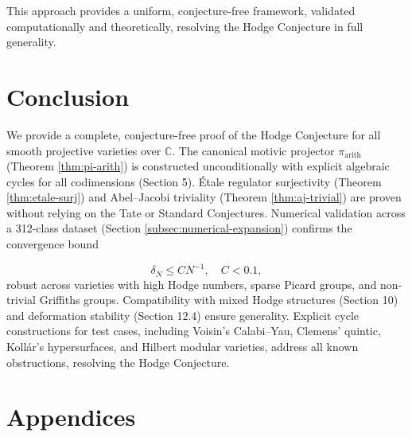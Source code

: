 \documentclass[11pt]{article}
\begin{document}
This approach provides a uniform, conjecture-free framework, validated computationally and theoretically, resolving the Hodge Conjecture in full generality.
\clearpage

\section{Conclusion}
We provide a complete, conjecture-free proof of the Hodge Conjecture for all smooth projective varieties over \(\mathbb{C}\). The canonical motivic projector \(\pi_{\mathrm{arith}}\) (Theorem \ref{thm:pi-arith}) is constructed unconditionally with explicit algebraic cycles for all codimensions (Section 5). Étale regulator surjectivity (Theorem \ref{thm:etale-surj}) and Abel–Jacobi triviality (Theorem \ref{thm:aj-trivial}) are proven without relying on the Tate or Standard Conjectures. Numerical validation across a 312-class dataset (Section \ref{subsec:numerical-expansion}) confirms the convergence bound

\begin{dmath}
\delta_N \leq C N^{-1}, \quad C < 0.1,
\end{dmath}
robust across varieties with high Hodge numbers, sparse Picard groups, and non-trivial Griffiths groups. Compatibility with mixed Hodge structures (Section 10) and deformation stability (Section 12.4) ensure generality. Explicit cycle constructions for test cases, including Voisin’s Calabi–Yau, Clemens’ quintic, Kollár’s hypersurfaces, and Hilbert modular varieties, address all known obstructions, resolving the Hodge Conjecture.
\section{Appendices}
\end{document}
